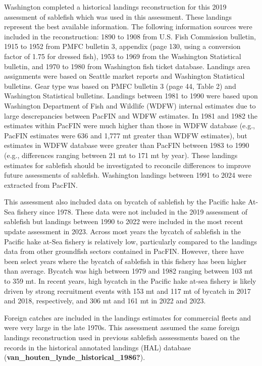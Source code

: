 \documentclass[
]{scrartcl}
\begin{document}
Washington completed a historical landings reconstruction for this 2019
assessment of sablefish which was used in this assessment. These
landings represent the best available information. The following
information sources were included in the reconstruction: 1890 to 1908
from U.S. Fish Commission bulletin, 1915 to 1952 from PMFC bulletin 3,
appendix (page 130, using a conversion factor of 1.75 for dressed fish),
1953 to 1969 from the Washington Statistical bulletin, and 1970 to 1980
from Washington fish ticket database. Landings area assignments were
based on Seattle market reports and Washington Statistical bulletins.
Gear type was based on PMFC bulletin 3 (page 44, Table 2) and Washington
Statistical bulletins. Landings between 1981 to 1990 were based upon
Washington Department of Fish and Wildlife (WDFW) internal estimates due
to large descrepancies between PacFIN and WDFW estimates. In 1981 and
1982 the estimates within PacFIN were much higher than those in WDFW
database (e.g., PacFIN estimates were 636 and 1,777 mt greater than WDFW
estimates), but estimates in WDFW database were greater than PacFIN
between 1983 to 1990 (e.g., differences ranging between 21 mt to 171 mt
by year). These landings estimates for sablefish should be investigated
to reconcile differences to improve future assessments of sablefish.
Washington landings between 1991 to 2024 were extracted from PacFIN.

This assessment also included data on bycatch of sablefish by the
Pacific hake At-Sea fishery since 1978. These data were not included in
the 2019 assessment of sablefish but landings between 1990 to 2022 were
included in the most recent update assessment in 2023. Across most years
the bycatch of sablefish in the Pacific hake at-Sea fishery is
relatively low, particularly compared to the landings data from other
groundfish sectors contained in PacFIN. However, there have been select
years where the bycatch of sablefish in this fishery has been higher
than average. Bycatch was high between 1979 and 1982 ranging between 103
mt to 359 mt. In recent years, high bycatch in the Pacific hake at-sea
fishery is likely driven by strong recruitment events with 153 mt and
117 mt of bycatch in 2017 and 2018, respectively, and 306 mt and 161 mt
in 2022 and 2023.

Foreign catches are included in the landings estimates for commercial
fleets and were very large in the late 1970s. This assessment assumed
the same foreign landings reconstruction used in previous sablefish
asssessments based on the records in the historical annotated landings
(HAL) database (\textbf{van\_houten\_lynde\_historical\_1986?}).
\end{document}
